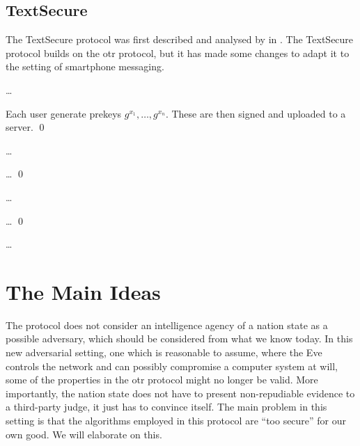 \documentclass[draft]{llncs}
\begin{document}
%
%
%

\subsection{TextSecure}

The TextSecure protocol was first described and analysed by 
\citeauthor{frosch2014secure} in \cite{frosch2014secure}.
The TextSecure protocol builds on the \ac{otr} protocol, but it has made some 
changes to adapt it to the setting of smartphone messaging.

\dots

\begin{protocol}
  Each user generate prekeys \(g^{x_1}, \ldots, g^{x_n}\).
  These are then signed and uploaded to a server.
  \qed
\end{protocol}

\dots

\begin{protocol}
  \dots
  \qed
\end{protocol}

\dots

\begin{protocol}
  \dots
  \qed
\end{protocol}

\dots


\section{The Main Ideas}

The protocol does not consider an intelligence agency of a nation state as 
a possible adversary, which should be considered from what we know today.
In this new adversarial setting, one which is reasonable to assume, where the 
Eve controls the network and can possibly compromise a computer system at will, 
some of the properties in the \ac{otr} protocol might no longer be valid.
More importantly, the nation state does not have to present non-repudiable 
evidence to a third-party judge, it just has to convince itself.
The main problem in this setting is that the algorithms employed in this 
protocol are \enquote{too secure} for our own good.
We will elaborate on this.
\end{document}

